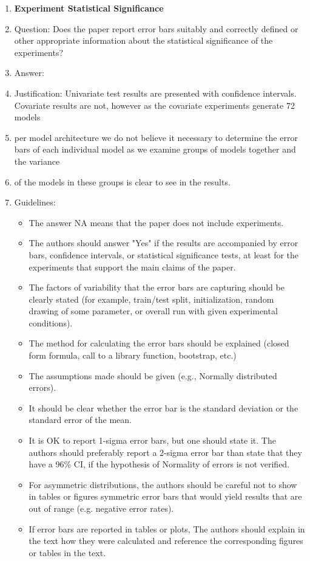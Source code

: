 \documentclass{article}
\begin{document}
\begin{enumerate}
\item {\bf Experiment Statistical Significance}
    \item[] Question: Does the paper report error bars suitably and correctly defined or other appropriate information about the statistical significance of the experiments?
    \item[] Answer: \answerYes{} %
    \item[] Justification: Univariate test results are presented with confidence intervals. Covariate results are not, however as the covariate experiments generate 72 models
    \item[] per model architecture we do not believe it necessary to determine the error bars of each individual model as we examine groups of models together and the variance 
    \item[] of the models in these groups is clear to see in the results.  
    \item[] Guidelines:
    \begin{itemize}
        \item The answer NA means that the paper does not include experiments.
        \item The authors should answer "Yes" if the results are accompanied by error bars, confidence intervals, or statistical significance tests, at least for the experiments that support the main claims of the paper.
        \item The factors of variability that the error bars are capturing should be clearly stated (for example, train/test split, initialization, random drawing of some parameter, or overall run with given experimental conditions).
        \item The method for calculating the error bars should be explained (closed form formula, call to a library function, bootstrap, etc.)
        \item The assumptions made should be given (e.g., Normally distributed errors).
        \item It should be clear whether the error bar is the standard deviation or the standard error of the mean.
        \item It is OK to report 1-sigma error bars, but one should state it. The authors should preferably report a 2-sigma error bar than state that they have a 96\% CI, if the hypothesis of Normality of errors is not verified.
        \item For asymmetric distributions, the authors should be careful not to show in tables or figures symmetric error bars that would yield results that are out of range (e.g. negative error rates).
        \item If error bars are reported in tables or plots, The authors should explain in the text how they were calculated and reference the corresponding figures or tables in the text.
    \end{itemize}


\end{enumerate}
\end{document}
